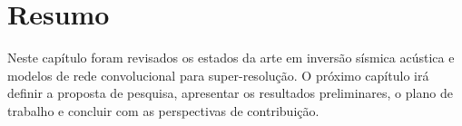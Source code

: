 \section{Resumo}

Neste capítulo foram revisados os estados da arte em inversão sísmica acústica e modelos
de rede convolucional para super-resolução.
O próximo capítulo irá definir a proposta de pesquisa, apresentar os resultados preliminares, o plano de trabalho e concluir com as perspectivas de
contribuição.
